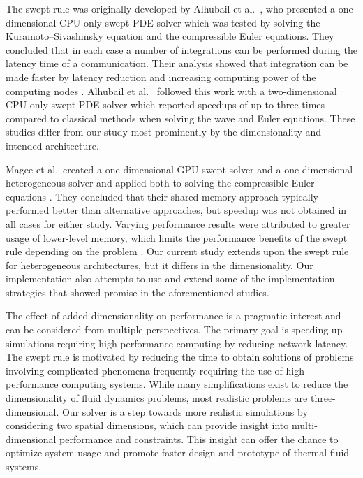\documentclass[preprints,article,accept,moreauthors,pdftex]{Definitions/mdpi}
\begin{document}
The swept rule was originally developed by Alhubail et al.~\cite{Alhubail2016ThePDEs}, who presented a one-dimensional CPU-only swept PDE solver which was tested by solving the Kuramoto--Sivashinsky equation and the compressible Euler equations. 
They concluded that in each case a number of integrations can be performed during the latency time of a communication. Their analysis showed that integration can be made faster by latency reduction and increasing computing power of the computing nodes \cite{Alhubail2016ThePDEs}. 
Alhubail et al.~\cite{Alhubail2018ThePDEs} followed this work with a two-dimensional CPU only swept PDE solver which reported speedups of up to three times compared to classical methods when solving the wave and Euler equations. 
These studies differ from our study most prominently by the dimensionality and intended architecture.

Magee et al.\ created a one-dimensional GPU swept solver and a one-dimensional heterogeneous solver and applied both to solving the compressible Euler equations \cite{Magee2018AcceleratingDecomposition,Magee2020ApplyingSystems}. 
They concluded that their shared memory approach typically performed better than alternative approaches, but speedup was not obtained in all cases for either study. Varying performance results were attributed to greater usage of lower-level memory, which limits the performance benefits of the swept rule depending on the problem \cite{Magee2018AcceleratingDecomposition}.
Our current study extends upon the swept rule for heterogeneous architectures, but it differs in the dimensionality. Our implementation also attempts to use and extend some of the implementation strategies that showed promise in the aforementioned studies.

The effect of added dimensionality on performance is a pragmatic interest and can be considered from multiple perspectives. The primary goal is speeding up simulations requiring high performance computing by reducing network latency. The swept rule is motivated by reducing the time to obtain solutions of problems involving complicated phenomena frequently requiring the use of high performance computing systems. While many simplifications exist to reduce the dimensionality of fluid dynamics problems, most realistic problems are three-dimensional. Our solver is a step towards more realistic simulations by considering two spatial dimensions, which can provide insight into multi-dimensional performance and constraints. This insight can offer the chance to optimize system usage and promote faster design and prototype of thermal fluid systems.
\end{document}
